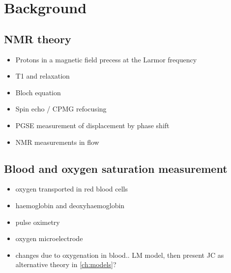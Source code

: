 \chapter{Background}\label{ch:background}

\section{NMR theory}
\begin{itemize}
\item Protons in a magnetic field precess at the Larmor frequency
\item T1 and \Ttwo relaxation
\item Bloch equation
\item Spin echo / CPMG refocusing
\item PGSE measurement of displacement by phase shift
\item NMR measurements in flow
\end{itemize}

\section{Blood and oxygen saturation measurement}
\begin{itemize}
\item oxygen transported in red blood cells
\item haemoglobin and deoxyhaemoglobin
\item pulse oximetry
\item oxygen microelectrode
\item \Ttwo changes due to oxygenation in blood.. LM model, then present JC as alternative theory in \autoref{ch:models}?

\end{itemize}
